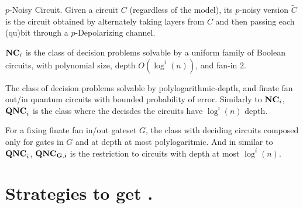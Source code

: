\documentclass[manuscript,screen,review]{acmart}
\begin{document}
{\begin{figure}
\begin{center}
  \end{center}
\end{figure}

  \begin{definition}{$p$-Noisy Circuit.}
    Given a circuit $C$ (regardless of the model), its $p$-noisy version $\tilde{C}$ is the circuit obtained by alternately taking layers from $C$ and then passing each (qu)bit through a $p$-Depolarizing channel.
  \end{definition}

\begin{definition}
$\mathbf{NC}_i$ is the class of decision problems solvable by a uniform family of Boolean circuits, with polynomial size, depth $O(\log^i(n))$, and fan-in $2$. 
\end{definition}

\begin{definition}[$\QNC{}$]
  The class of decision problems solvable by polylogarithmic-depth, and finate fan out/in quantum circuits with bounded probability of error. Similarly to $\mathbf{NC}_i{}$, $\mathbf{QNC}_i{}$ is the class where the decisdes the circuits have $\log^i (n)$ depth.  
\end{definition}

\begin{definition}[$\QNCG{}$]
  For a fixing finate fan in/out gateset $G$, the class with deciding circuits composed only for gates in $G$ and at depth at most polylogaritmic. And in similar to $\mathbf{QNC}_{i}{}$, $\mathbf{QNC_{G,i}}{}$ is the restriction to circuits with depth at most $\log^{i}(n)$.  
\end{definition}



  \section{ Strategies to get \CDO. }  \label{sec:opt}

}
\end{document}
